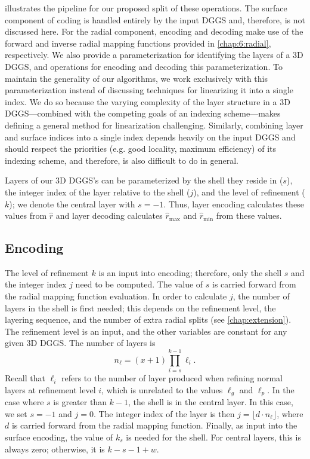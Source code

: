 illustrates the pipeline for our proposed split of these operations.
The surface component of coding is handled entirely by the input DGGS and, therefore, is not discussed here.
For the radial component, encoding and decoding make use of the forward and inverse radial mapping functions provided in \cref{chap:6:radial}, respectively.
We also provide a parameterization for identifying the layers of a 3D DGGS, and operations for encoding and decoding this parameterization.
To maintain the generality of our algorithms, we work exclusively with this parameterization instead of discussing techniques for linearizing it into a single index.
We do so because the varying complexity of the layer structure in a 3D DGGS---combined with the competing goals of an indexing scheme---makes defining a general method for linearization challenging.
Similarly, combining layer and surface indices into a single index depends heavily on the input DGGS and should respect the priorities (e.g. good locality, maximum efficiency) of its indexing scheme, and therefore, is also difficult to do in general.





Layers of our 3D DGGS's can be parameterized by the shell they reside in ($s$), the integer index of the layer relative to the shell ($j$), and the level of refinement ($k$); we denote the central layer with $s = -1$.
Thus, layer encoding calculates these values from $\hat{r}$ and layer decoding calculates $\hat{r}_\mathrm{max}$ and $\hat{r}_\mathrm{min}$ from these values.


\subsection{Encoding}
The level of refinement $k$ is an input into encoding; therefore, only the shell $s$ and the integer index $j$ need to be computed.
The value of $s$ is carried forward from the radial mapping function evaluation.
In order to calculate $j$, the number of layers in the shell is first needed; this depends on the refinement level, the layering sequence, and the number of extra radial splits (see \cref{chap:extension}).
The refinement level is an input, and the other variables are constant for any given 3D DGGS.
The number of layers is
%
\begin{equation*}
n_\ell = \left( x+1 \right) \prod_{i = s}^{k - 1} \ell_i.
\end{equation*}
%
Recall that $\ell_i$ refers to the number of layer produced when refining normal layers at refinement level $i$, which is unrelated to the values $\ell_g$ and $\ell_p$.
In the case where $s$ is greater than $k-1$, the shell is in the central layer.
In this case, we set $s = -1$ and $j = 0$.
The integer index of the layer is then $j = \lfloor d \cdot n_\ell \rfloor$, where $d$ is carried forward from the radial mapping function.
Finally, as input into the surface encoding, the value of $k_s$ is needed for the shell.
For central layers, this is always zero; otherwise, it is $k - s - 1 + w$.


